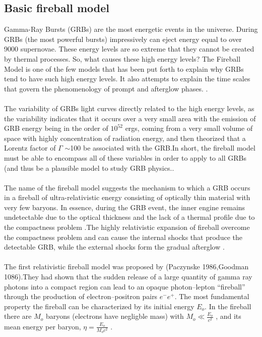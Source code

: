 \subsection{ Basic fireball model}
Gamma-Ray Bursts (GRBs) are  the most energetic events in the universe. During GRBs (the most powerful bursts) impressively can eject energy equal to over 9000 supernovae. These energy levels are so extreme that they cannot be created by thermal processes. So, what causes these high energy levels? The Fireball Model is one of the few models that has been put forth to explain why GRBs tend to have such high energy levels. It also attempts to explain the time scales that govern the phenomenology of prompt and afterglow phases. \citep {13} \citep{14}.\\\\ 
The variability of GRBs light curves  directly related to the high energy levels, as the variability indicates that it occurs over a very small area with the emission of  GRB energy being in  the order of $10^{52}$ ergs, coming from a very small volume of space  with  highly concentration of radiation energy, and  then  theorized that a Lorentz factor of $ \Gamma $ $ \sim $100  be associated with the GRB.In short, the fireball model must be able to encompass all of these variables in order to apply to all GRBs (and thus be a plausible model to study GRB physics.\citep {14}.\\\\
The name of the fireball model suggests the mechanism to which a GRB occurs in a fireball of ultra-relativistic energy consisting of optically thin material with very few baryons. In essence, during the GRB event, the inner engine remains undetectable due to the optical thickness and the lack of a thermal profile due to the compactness problem .The highly relativistic expansion of fireball overcome the compactness problem and  can cause  the internal shocks that produce  the detectable GRB, while the external shocks form the gradual afterglow \citep{15}.\\\\
 The first relativistic fireball model was proposed by (Paczynske 1986,Goodman 1086).They had shown that the sudden release of a large quantity of gamma ray photons into a compact region can lead to an opaque photon–lepton “fireball” through the production of electron–positron pairs  $ e^{-} e^{+} $. The most fundamental property the fireball can be characterized by its initial energy $ E_{o}$. In the fireball there are $ M_{o} $ baryons (electrons have negligble mass)  with $ M_{o} \ll\frac{E_{o}}{c^{2}}$ , and its mean energy per baryon, $\eta = \frac{E_{o}}{M_{o}c^{2}}$ \citep{14} \citep{15}.\\\\
